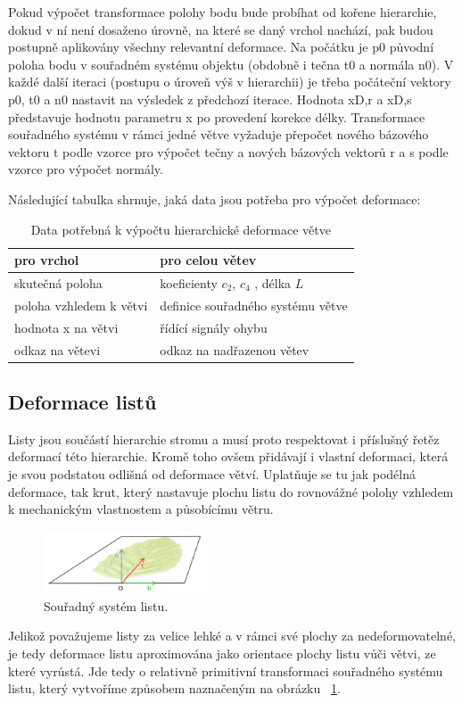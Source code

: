 Pokud výpočet transformace polohy bodu bude probíhat od kořene hierarchie, dokud v ní není dosaženo úrovně, na které se daný vrchol nachází, pak budou postupně aplikovány všechny relevantní deformace. Na počátku je p0 původní poloha bodu v souřadném systému objektu (obdobně i tečna t0  a normála n0). V každé další iteraci (postupu o úroveň výš v hierarchii) je třeba počáteční vektory p0, t0 a n0 nastavit na výsledek z předchozí iterace. Hodnota xD,r a xD,s představuje hodnotu parametru x po provedení korekce délky.  Transformace souřadného systému v rámci jedné větve vyžaduje přepočet nového bázového vektoru t podle vzorce pro výpočet tečny a nových bázových vektorů r a s podle vzorce pro výpočet normály. 

Následující tabulka shrnuje, jaká data jsou potřeba pro výpočet deformace:
\newline
\begin{table}[center]
\caption{Data potřebná k výpočtu hierarchické deformace větve}
\begin{tabular}{| l | l | }
  \hline                       
  pro vrchol & pro celou větev  \\
\hline   
  skutečná poloha & koeficienty $c_2$,  $c_4$ , délka  $L$  \\
  poloha vzhledem k větvi & definice souřadného systému větve \\
hodnota x na větvi & řídící signály ohybu \\
odkaz na větevi & odkaz na nadřazenou větev \\
  \hline  
\end{tabular}
\end{table}

\subsection{Deformace listů}
Listy jsou součástí hierarchie stromu a musí proto respektovat i příslušný řetěz deformací této hierarchie. Kromě toho ovšem přidávají i vlastní deformaci, která je svou podstatou odlišná od deformace větví. Uplatňuje se tu jak podélná deformace, tak krut, který nastavuje plochu listu do rovnovážné polohy vzhledem k mechanickým vlastnostem a působícímu větru. 
\begin{figure}[here]
\begin{center}
\includegraphics[width=0.45\textwidth]{./figures/leafCoordSystem2.png}
\end{center}
\caption{  Souřadný systém listu.
\label{fig:bendLeaf}
}

\end{figure}
Jelikož považujeme listy za velice lehké a v rámci své plochy za nedeformovatelné, je tedy deformace listu aproximována jako orientace plochy listu vůči větvi, ze které vyrůstá. Jde tedy o relativně primitivní transformaci souřadného systému listu, který vytvoříme způsobem naznačeným na obrázku ~\ref{fig:bendLeaf}.


